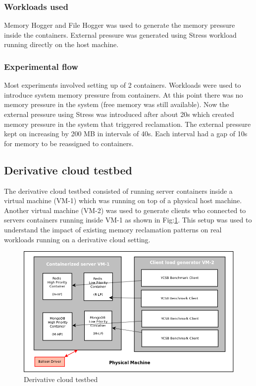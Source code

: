       \subsubsection{Workloads used}
	
	Memory Hogger and File Hogger was used to generate the memory pressure inside the containers. External pressure was generated 
using Stress workload running directly on the host machine.

      \subsubsection{Experimental flow}
	
	Most experiments involved setting up of 2 containers. Workloads were used to introduce system memory pressure from containers. At 
this point there was no memory pressure in the system (free memory was still available). Now the external pressure using Stress was 
introduced after about 20s which created memory pressure in the system that triggered reclamation. The external pressure kept on increasing 
by 200 MB in intervals of 40s. Each interval had a gap of 10s for memory to be reassigned to containers.

    \subsection{Derivative cloud testbed}
      \label{section_testbed_derivative}
      
       The derivative cloud testbed consisted of running server containers inside a virtual machine (VM-1) which was running on top of a 
physical host machine. Another virtual machine (VM-2) was used to generate clients who connected to servers containers running inside VM-1 
as shown in Fig:\ref{img_derived_setup}. This setup was used to understand the impact of existing memory reclamation patterns on real 
workloads running on a derivative cloud setting.
      
      \begin{figure}
	\centering
	\includegraphics[width=1\textwidth]{images/Experimental_Setup.png}
	\caption{Derivative cloud testbed}
	\label{img_derived_setup}
      \end{figure}
      
